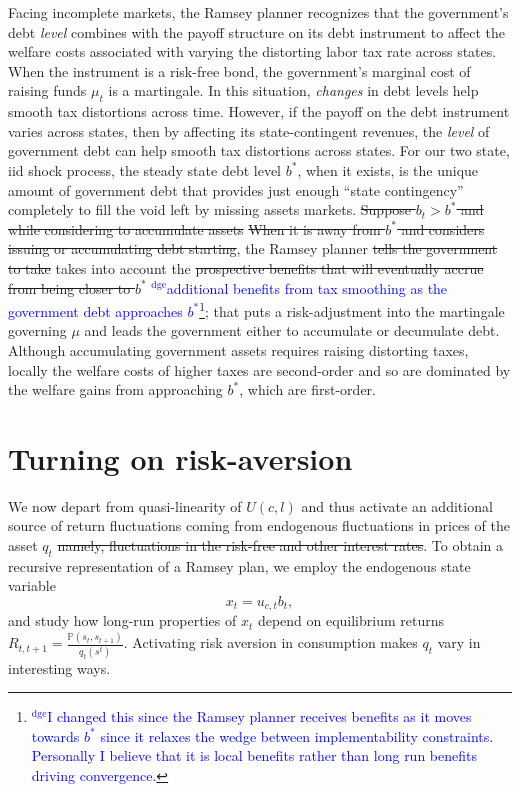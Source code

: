 \documentclass[12pt]{article}
\newcommand{\dge}[1]{\textcolor{blue}{$^{\textrm{dge}}${#1}}}
\begin{document}
	  Facing incomplete markets, the  Ramsey planner recognizes that   the government's debt {\em level} combines with  the
 payoff structure on its debt instrument to affect  the welfare costs associated with varying the distorting labor tax rate across states.  When the
  instrument is a risk-free bond, the government's marginal cost of raising funds $\mu_t$ is  a martingale. In this situation,
    {\em changes} in debt levels  help smooth tax distortions across time. 		
	However, if the  payoff on the debt instrument varies across states, then  by affecting its state-contingent revenues, the {\em level} of government debt can help smooth tax distortions across states.
	For our two state, iid shock process,  the steady state debt level $b^*$, when it exists, is the unique amount of government debt
that provides just enough ``state contingency'' completely to fill the void left by  missing assets markets.	
	\st{Suppose $b_t>b^*$ and  while considering to  accumulate assets} \st{When it is away from $b^*$ and  considers issuing or accumulating debt starting},  the Ramsey planner \st{tells the government to take} takes into account
the \st{prospective benefits that will eventually accrue from being closer to $b^*$} \dge{additional benefits from tax smoothing as the government debt approaches $b^*$}\footnote{\dge{I changed this since the Ramsey planner receives benefits as it moves towards $b^*$ since it relaxes the wedge between implementability constraints.  Personally I believe that it is local benefits rather than long run benefits driving convergence.}};  that puts a risk-adjustment into the martingale governing $\mu$ and leads the
 government either to accumulate or decumulate debt.	
	 Although accumulating government assets requires  raising distorting  taxes, locally  the welfare costs of higher taxes are second-order and
so are  dominated by the welfare gains from approaching  $b^*$, which are first-order.



\section{Turning on risk-aversion}

  We now depart from quasi-linearity of $U(c,l)$ and thus activate an additional source of return fluctuations coming from endogenous fluctuations in prices of the asset $q_t$ \st{namely,
  fluctuations in the risk-free and other interest rates}.  To obtain a recursive representation of a Ramsey plan,
  we employ the endogenous state variable
  \[x_t=u_{c,t}b_{t} ,\]
  and study how long-run properties of $x_t$ depend on equilibrium returns $R_{t,t+1}=\frac{\mathbb{P}(s_t,s_{t+1})}{q_t(s^t)}$.
   Activating risk aversion in consumption makes $q_t$ vary in interesting ways.
\end{document}
